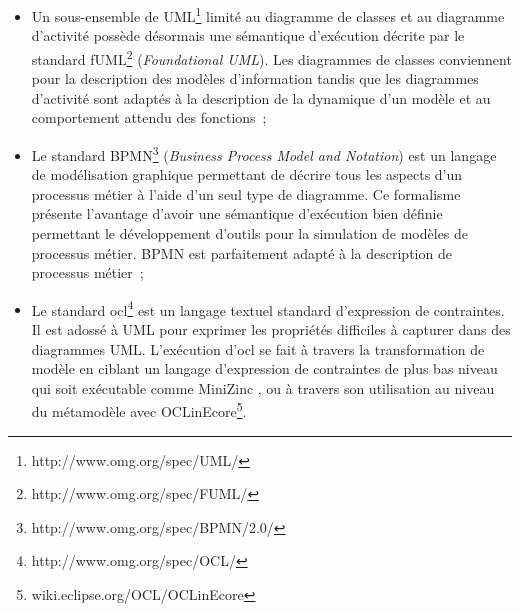\begin{itemize}

\item Un sous-ensemble de UML\footnote{http://www.omg.org/spec/UML/} limité au diagramme de classes et au diagramme d'activité possède désormais une sémantique d'exécution décrite par le standard fUML\footnote{http://www.omg.org/spec/FUML/} (\textit{Foundational UML}). Les diagrammes de classes conviennent pour la description des modèles d'information tandis que les diagrammes d'activité sont adaptés à la description de la dynamique d'un modèle et au comportement attendu des fonctions~;

\item Le standard BPMN\footnote{http://www.omg.org/spec/BPMN/2.0/} (\textit{Business Process Model and Notation}) est un langage de modélisation graphique permettant de décrire tous les aspects d'un processus métier à l'aide d'un seul type de diagramme. Ce formalisme présente l'avantage d'avoir une sémantique d'exécution bien définie permettant le développement d'outils pour la simulation de modèles de processus métier. BPMN est parfaitement adapté à la description de processus métier~;

\item Le standard \gls{ocl}\footnote{http://www.omg.org/spec/OCL/} est un langage textuel standard d'expression de contraintes. Il est adossé à UML pour exprimer les propriétés difficiles à capturer dans des diagrammes UML. L'exécution d'\gls{ocl} se fait à travers la transformation de modèle en ciblant un langage d'expression de contraintes de plus bas niveau qui soit exécutable comme MiniZinc \cite{nethercote2007minizinc}, ou à travers son utilisation au niveau du métamodèle avec OCLinEcore\footnote{wiki.eclipse.org/OCL/OCLinEcore}.

\end{itemize}










